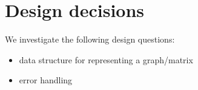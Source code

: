 \section{Design decisions}
\label{sec:decisions}

We investigate the following design questions:

\begin{itemize}
    \item data structure for representing a graph/matrix
    \item error handling
\end{itemize}
